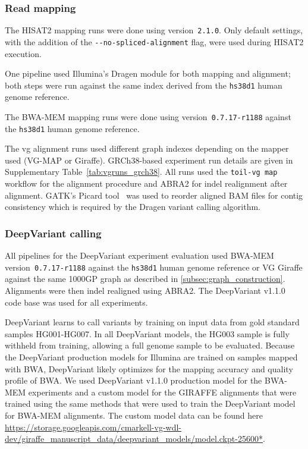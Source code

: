 \documentclass[11pt]{ucscthesis}
\begin{document}
\subsubsection{Read mapping}
The HISAT2 mapping runs were done using version~\texttt{2.1.0}.
Only default settings, with the addition of the \texttt{-{}-no-spliced-alignment} flag, were used during HISAT2 execution.

One pipeline used Illumina's Dragen module for both mapping and alignment; both steps were run against the same index derived from the \texttt{hs38d1} human genome reference.

The BWA-MEM mapping runs were done using version~\texttt{0.7.17-r1188} against the \texttt{hs38d1} human genome reference.

The vg alignment runs used different graph indexes depending on the mapper used (VG-MAP or Giraffe).
GRCh38-based experiment run details are given in Supplementary Table~\ref{tab:vgruns_grch38}.
All runs used the \texttt{toil-vg~map} workflow for the alignment procedure and ABRA2\cite{mose2019improved} for indel realignment after alignment.
GATK's Picard tool~\cite{Picard2019toolkit} was used to reorder aligned BAM files for contig consistency which is required by the Dragen variant calling algorithm.


\subsubsection{DeepVariant calling}
\label{subsec:deepvariant_calling}

All pipelines for the DeepVariant experiment evaluation used BWA-MEM version~\texttt{0.7.17-r1188} against the \texttt{hs38d1} human genome reference or VG Giraffe against the same 1000GP graph as described in \ref{subsec:graph_construction}.
Alignments were then indel realigned using ABRA2\cite{mose2019improved}.
The DeepVariant v1.1.0 code base was used for all experiments.

DeepVariant learns to call variants by training on input data from gold standard samples HG001-HG007.
In all DeepVariant models, the HG003 sample is fully withheld from training, allowing a full genome sample to be evaluated.
Because the DeepVariant production models for Illumina are trained on samples mapped with BWA, DeepVariant likely optimizes for the mapping accuracy and quality profile of BWA.
We used DeepVariant v1.1.0 production model for the BWA-MEM experiments and a custom model for the GIRAFFE alignments that were trained using the same methods that were used to train the DeepVariant model for BWA-MEM alignments.
The custom model data can be found here \url{https://storage.googleapis.com/cmarkell-vg-wdl-dev/giraffe_manuscript_data/deepvariant_models/model.ckpt-25600*}.
\end{document}

